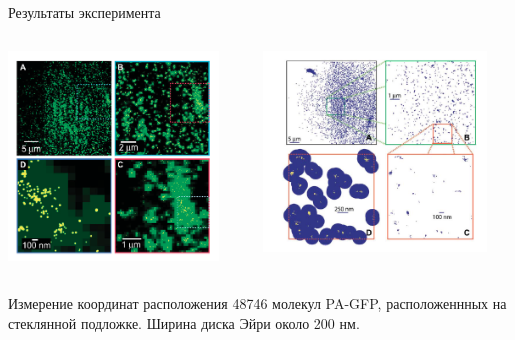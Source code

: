 \documentclass[9pt, compress, xcolor=table]{beamer}
\begin{document}
\begin{frame}{Результаты эксперимента}
\begin{columns}[c]
\column{6.5cm}
\begin{center}
\includegraphics[width=0.9\textwidth]{lm9}
\end{center}
\column{6.5cm}
\begin{center}
\includegraphics[width=0.9\textwidth]{lm10}
\end{center}
\end{columns}

Измерение координат расположения 48746 молекул PA-GFP, расположеннных на стеклянной подложке. Ширина диска Эйри около 200 нм.
\end{frame}
\end{document}

